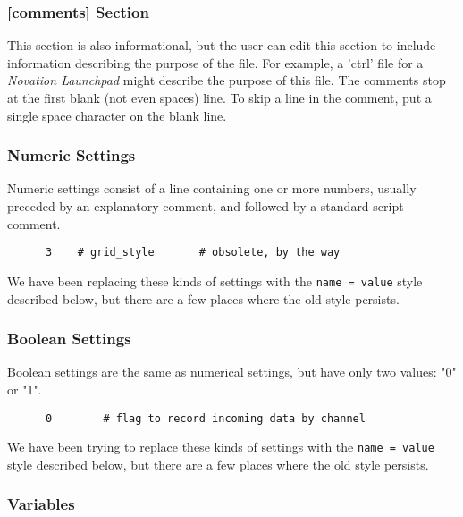 \subsubsection{[comments] Section}
\label{subsec:configuration_common_comments_section}

   This section is also informational, but the user can edit this section to
   include information describing the purpose of the file.  For example, a
   'ctrl' file for a \textsl{Novation Launchpad} might describe the purpose of
   this file.  The comments stop at the first blank (not even spaces) line.  To
   skip a line in the comment, put a single space character on the blank line.

\subsubsection{Numeric Settings}
\label{subsec:configuration_common_numeric_settings}

   Numeric settings consist of a line containing one or more numbers, usually
   preceded by an explanatory comment, and followed by a standard script
   comment.

   \begin{verbatim}
      3    # grid_style       # obsolete, by the way
   \end{verbatim}

   We have been replacing these kinds of settings with the
   \texttt{name = value} style described below, but there are a few places
   where the old style persists.

\subsubsection{Boolean Settings}
\label{subsec:configuration_common_boolean_settings}

   Boolean settings are the same as numerical settings, but have only
   two values: "0" or "1".

   \begin{verbatim}
      0        # flag to record incoming data by channel
   \end{verbatim}

   We have been trying to replace these kinds of settings with the
   \texttt{name = value} style described below, but there are a few places
   where the old style persists.

\subsubsection{Variables}
\label{subsec:configuration_common_variables}

